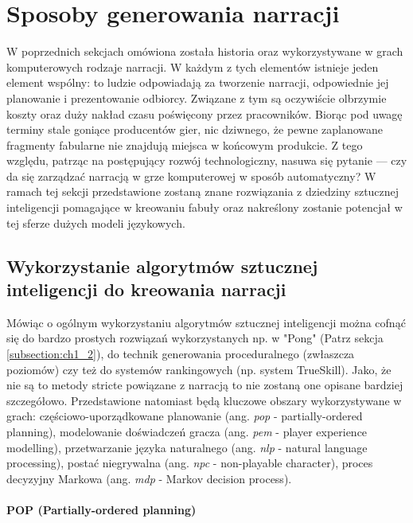 \graphicspath{{chapters/chapter4/imgs/}}

\chapter{Sposoby generowania narracji}\label{chapter:ch4}

W poprzednich sekcjach omówiona została historia oraz wykorzystywane w grach komputerowych rodzaje
narracji. W każdym z tych elementów istnieje jeden element wspólny: to ludzie odpowiadają za tworzenie
narracji, odpowiednie jej planowanie i prezentowanie odbiorcy. Związane z tym są oczywiście olbrzymie
koszty oraz duży nakład czasu poświęcony przez pracowników. Biorąc pod uwagę terminy stale goniące
producentów gier, nic dziwnego, że pewne zaplanowane fragmenty fabularne nie znajdują miejsca w końcowym
produkcie. Z tego względu, patrząc na postępujący rozwój technologiczny, nasuwa się pytanie ---
czy da się zarządzać narracją w grze komputerowej w sposób automatyczny? W ramach tej sekcji
przedstawione zostaną znane rozwiązania z dziedziny sztucznej inteligencji pomagające w kreowaniu fabuły
oraz nakreślony zostanie potencjał w tej sferze dużych modeli językowych.

\section{Wykorzystanie algorytmów sztucznej inteligencji do kreowania narracji}\label{section:ch4_1}

Mówiąc o ogólnym wykorzystaniu algorytmów sztucznej inteligencji można cofnąć się do bardzo prostych
rozwiązań wykorzystanych np. w "Pong" (Patrz sekcja \ref{subsection:ch1_2}), do technik generowania
proceduralnego (zwłaszcza poziomów) czy też do systemów rankingowych (np. system TrueSkill). Jako, że
nie są to metody stricte powiązane z narracją to nie zostaną one opisane bardziej szczegółowo.
Przedstawione natomiast będą kluczowe obszary wykorzystywane w grach: częściowo-uporządkowane planowanie
(ang. \textit{\gls{pop}} - partially-ordered planning), modelowanie doświadczeń gracza (ang. \textit{\gls{pem}} -
player experience modelling), przetwarzanie języka naturalnego (ang. \textit{\gls{nlp}} - natural language
processing), postać niegrywalna (ang. \textit{\gls{npc}} - non-playable character), proces decyzyjny Markowa
(ang. \textit{\gls{mdp}} - Markov decision process).

\subsubsection*{POP (Partially-ordered planning)}

